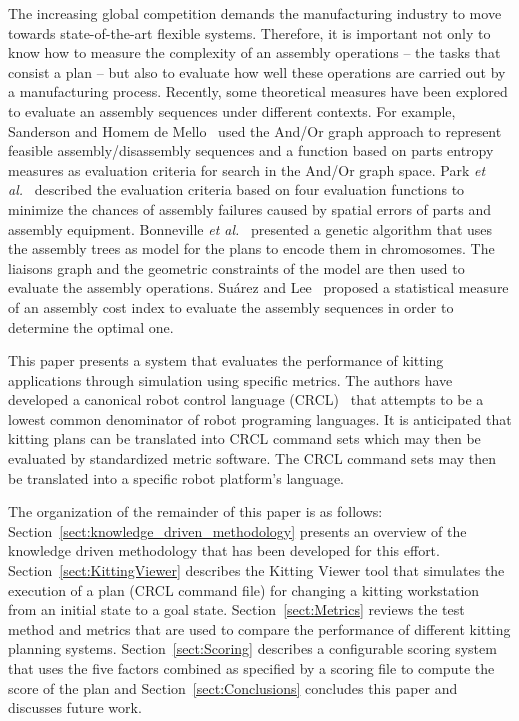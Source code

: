 The increasing global competition demands the manufacturing industry to move towards state-of-the-art flexible systems. Therefore, it is important not only to know how to measure the complexity of an assembly operations -- the tasks that consist a plan -- but also to evaluate how well these operations are carried out by a manufacturing process. Recently, some theoretical measures have been explored to evaluate an assembly sequences under different contexts. For example, Sanderson and Homem de Mello~\cite{SANDERSON.1987} used the And/Or graph approach to represent feasible assembly/disassembly sequences and a function based on parts entropy measures as evaluation criteria for search in the And/Or graph space. Park \textit{et al.}~\cite{PARK.1991} described the evaluation criteria based on four evaluation functions to minimize the chances of assembly failures caused by spatial errors of parts and assembly equipment. Bonneville \textit{et al.}~\cite{BONNEVILLE.1995} presented a genetic algorithm that uses the assembly trees as model for the plans to encode them in chromosomes. The liaisons graph and the geometric constraints of the model are then used to evaluate the assembly operations. Su\'{a}rez and Lee~\cite{SUAREZ.1997} proposed a statistical measure of an assembly cost index to evaluate the assembly sequences in order to determine the optimal one.


This paper presents a system that evaluates the performance of kitting applications through simulation using specific metrics. The authors have developed a canonical robot control language (CRCL)~\cite{NISTIR.Balakirsky} that attempts to be a lowest common denominator of robot programing languages. It is anticipated that kitting plans can be translated into CRCL command sets which may then be evaluated by standardized metric software. The CRCL command sets may then be translated into a specific robot platform's language.

The organization of the remainder of this paper is as follows: Section~\ref{sect:knowledge_driven_methodology} presents an overview of the knowledge driven methodology that has been developed for this effort. Section~\ref{sect:KittingViewer} describes the Kitting Viewer tool that
simulates the execution of a plan (CRCL command file) for changing a kitting workstation from an initial state to a goal state. Section~\ref{sect:Metrics} reviews the test method and metrics that are used to compare the performance of different kitting planning systems. Section~\ref{sect:Scoring} describes a configurable scoring system that uses the five factors combined as specified by a scoring file to compute
the score of the plan and Section~\ref{sect:Conclusions} concludes this paper and discusses future work.


